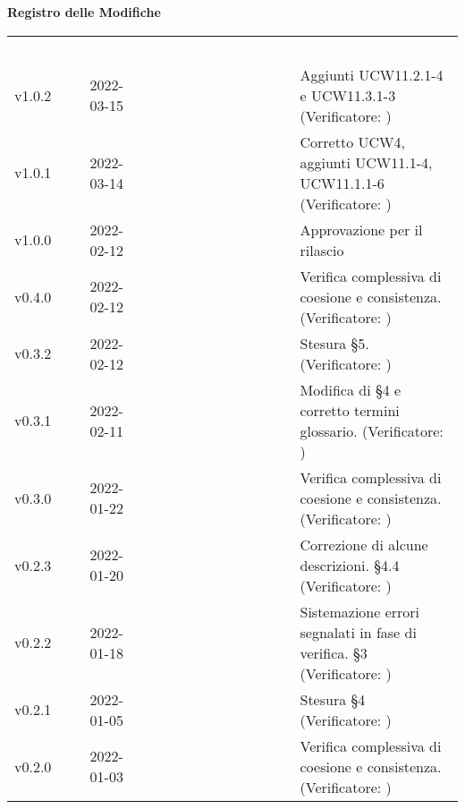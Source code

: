 
{\LARGE{\textbf{Registro delle Modifiche}}} \\
\renewcommand{\arraystretch}{1.5}
\begin{longtable}{ m{}<{\centering}  m{}<{\centering}  m{}<{\centering}  m{}<{\centering}  m{}<{\centering} }
	\rowcolor{darkblue}
	\textcolor{white}{\textbf{Versione}} &\textcolor{white}{\textbf{Data}}& \textcolor{white}{\textbf{Nominativo}} & \textcolor{white}{\textbf{Ruolo}}&\textcolor{white}{\textbf{Descrizione}}\\ 
	v1.0.2 & 2022-03-15& \LW & \AN{} & Aggiunti UCW11.2.1-4 e UCW11.3.1-3 (Verificatore: \textit{})  \\

	v1.0.1 & 2022-03-14& \GC & \AN{} & Corretto UCW4, aggiunti UCW11.1-4, UCW11.1.1-6 (Verificatore: \textit{})  \\
	
	v1.0.0& 2022-02-12& \EP{} &  \RE{}  & Approvazione per il rilascio\\

	v0.4.0 & 2022-02-12 & \FP{} & \AN{} & Verifica complessiva di coesione e consistenza. (Verificatore: \textit{\MG})\\

	v0.3.2 & 2022-02-12 & \FP{} & \AN{} & Stesura §5. (Verificatore: \textit{\MG})\\

	v0.3.1 & 2022-02-11 & \GC{} & \AN{} & Modifica di \S{}4 e corretto termini glossario. (Verificatore: \textit{\MG})\\
	
	v0.3.0 & 2022-01-22 & \GC{} & \AN{} & Verifica complessiva di coesione e consistenza. (Verificatore: \textit{\MG})\\		
	
	v0.2.3 & 2022-01-20 & \GC{} & \AN{} & Correzione di alcune descrizioni. \S{}4.4 (Verificatore: \textit{\MG})\\

	v0.2.2 & 2022-01-18 & \GC & \AN & Sistemazione errori segnalati in fase di verifica. \S{}3 (Verificatore: \textit{\PV}) \\

	v0.2.1 & 2022-01-05 & \GC{} & \AN{} & Stesura §4 (Verificatore: \textit{\MG})\\	

	v0.2.0 & 2022-01-03 & \LW{} & \AN{} & Verifica complessiva di coesione e consistenza. (Verificatore: \textit{\PV})\\	


\end{longtable}
